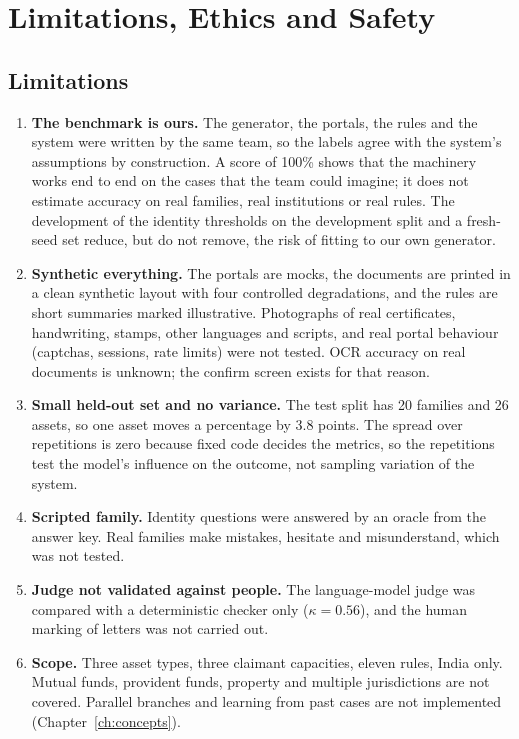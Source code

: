 \chapter{Limitations, Ethics and Safety}\label{ch:limits}
\section{Limitations}
\begin{enumerate}[leftmargin=*,itemsep=3pt]
\item \textbf{The benchmark is ours.} The generator, the portals, the rules and the system were written by the same team, so the labels agree with the system's assumptions by construction. A score of 100\% shows that the machinery works end to end on the cases that the team could imagine; it does not estimate accuracy on real families, real institutions or real rules. The development of the identity thresholds on the development split and a fresh-seed set reduce, but do not remove, the risk of fitting to our own generator.
\item \textbf{Synthetic everything.} The portals are mocks, the documents are printed in a clean synthetic layout with four controlled degradations, and the rules are short summaries marked illustrative. Photographs of real certificates, handwriting, stamps, other languages and scripts, and real portal behaviour (captchas, sessions, rate limits) were not tested. OCR accuracy on real documents is unknown; the confirm screen exists for that reason.
\item \textbf{Small held-out set and no variance.} The test split has 20 families and 26 assets, so one asset moves a percentage by 3.8 points. The spread over repetitions is zero because fixed code decides the metrics, so the repetitions test the model's influence on the outcome, not sampling variation of the system.
\item \textbf{Scripted family.} Identity questions were answered by an oracle from the answer key. Real families make mistakes, hesitate and misunderstand, which was not tested.
\item \textbf{Judge not validated against people.} The language-model judge was compared with a deterministic checker only ($\kappa=0.56$), and the human marking of letters was not carried out.
\item \textbf{Scope.} Three asset types, three claimant capacities, eleven rules, India only. Mutual funds, provident funds, property and multiple jurisdictions are not covered. Parallel branches and learning from past cases are not implemented (Chapter~\ref{ch:concepts}).
\end{enumerate}

